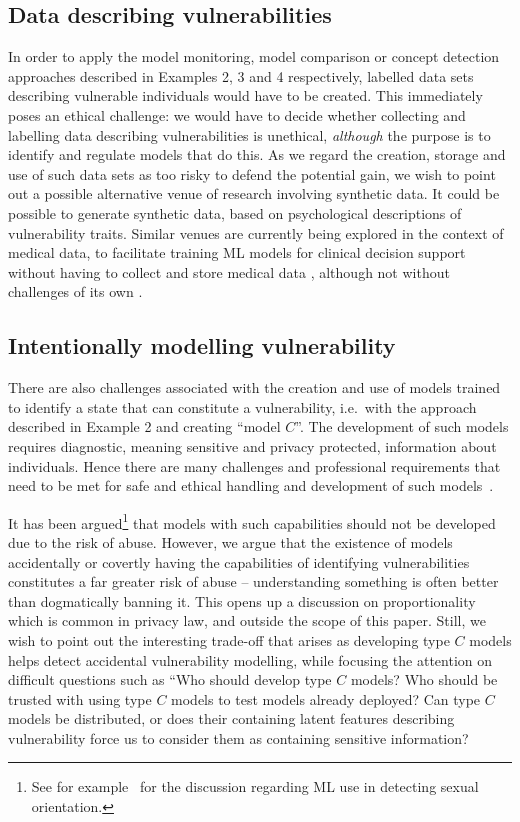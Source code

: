 \documentclass[11pt,theapa]{article}
\theoremstyle{plain}
\begin{document}
\subsection{Data describing vulnerabilities} \label{sec:challenge_data}
In order to apply the model monitoring, model comparison or concept detection approaches described in Examples 2, 3 and 4 respectively, labelled data sets describing vulnerable individuals would have to be created. This immediately poses an ethical challenge: we would have to decide whether collecting and labelling data describing vulnerabilities is unethical, \emph{although} the purpose is to identify and regulate models that do this. As we regard the creation, storage and use of such data sets as too risky to defend the potential gain, we wish to point out a possible alternative venue of research involving synthetic data. It could be possible to generate synthetic data, based on psychological descriptions of vulnerability traits. Similar venues are currently being explored in the context of medical data, to facilitate training ML models for clinical decision support without having to collect and store medical data \cite{deepfake_ecg}, although not without challenges of its own \cite{chen2021synthetic}.


\subsection{Intentionally modelling vulnerability}\label{sec:challenge_model}
There are also challenges associated with the creation and use of models trained to identify a state that can constitute a vulnerability, i.e.\ with the approach described in Example 2 and creating ``model $C$''. The development of such models requires diagnostic, meaning sensitive and privacy protected, information about individuals. Hence there are many challenges and professional requirements that need to be met for safe and ethical handling and development of such models~\cite{pargent2022}.

It has been argued\footnote{See for example~\cite{medium_stereotypes} for the discussion regarding ML use in detecting sexual orientation.} that models with such capabilities should not be developed due to the risk of abuse. However, we argue that the existence of models accidentally or covertly having the capabilities of identifying vulnerabilities constitutes a far greater risk of abuse -- understanding something is often better than dogmatically banning it. This opens up a discussion on proportionality which is common in privacy law, and outside the scope of this paper.
Still, we wish to point out the interesting trade-off that arises as developing type $C$ models helps detect accidental vulnerability modelling, while focusing the attention on difficult questions such as ``Who should develop type $C$ models? Who should be trusted with using type $C$ models to test models already deployed? Can type $C$ models be distributed, or does their containing latent features describing vulnerability force us to consider them as containing sensitive information?
\end{document}

